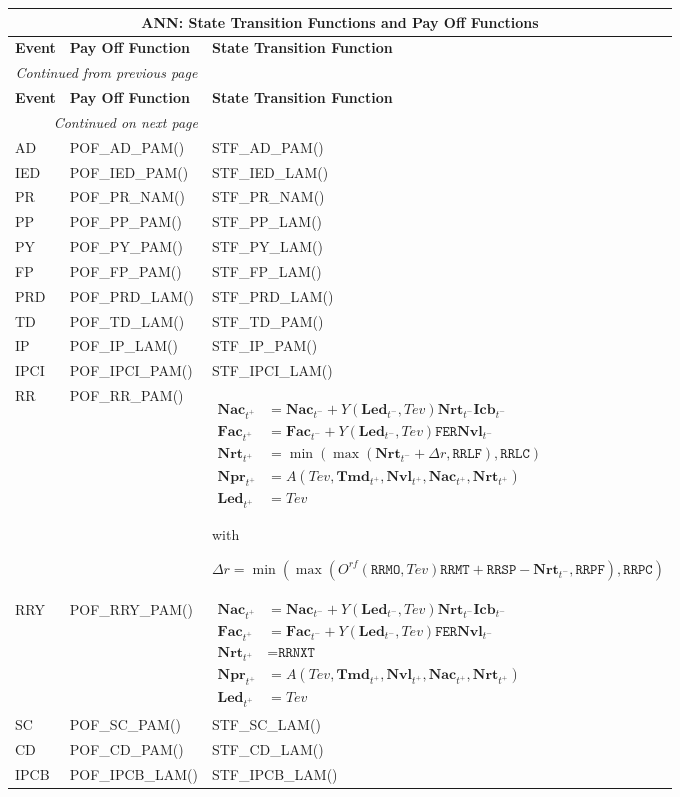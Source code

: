 \documentclass[9pt,oneside]{amsart}
\newenvironment{functions}[1]{
    	\begin{longtable}[H]{| p{0.05\textwidth} | p{0.42\textwidth} |  p{0.48\textwidth} |}
	\multicolumn{3}{c}{\textbf{#1: State Transition Functions and Pay Off Functions}}\\
	\hline
	\textbf{Event} & \textbf{Pay Off Function} & \textbf{State Transition Function}\\
	\hline
	\endfirsthead
	\multicolumn{2}{c}{\textit{Continued from previous page}} \\
	\hline
	\textbf{Event} & \textbf{Pay Off Function} & \textbf{State Transition Function}\\
	\hline
	\endhead
	\hline \multicolumn{2}{r}{\textit{Continued on next page}} \\
	\endfoot
	\hline
	\endlastfoot
}{%
	\hline
    	\end{longtable}
}
\newcommand{\svar}[2]{\textbf{#1}_{#2}}
\newcommand{\attr}[1]{\texttt{#1}}
\newcommand{\stf}[2]{STF\_#1\_#2()}
\newcommand{\pof}[2]{POF\_#1\_#2()}
\newcommand{\yfr}[2]{Y(#1,#2)}
\newcommand{\ann}[5]{A(#1,#2,#3,#4,#5)}
\newcommand{\obs}[3]{O^{#1}(#2,#3)}
\begin{document}





\begin{functions}{ANN}
	AD & \pof{AD}{PAM} & \stf{AD}{PAM} \\
	\hline
	IED & \pof{IED}{PAM} & \stf{IED}{LAM} \\ 
	\hline
	PR & \pof{PR}{NAM} & \stf{PR}{NAM} \\
	\hline
	PP & \pof{PP}{PAM}
		& \stf{PP}{LAM} \\
	\hline
	PY & \pof{PY}{PAM}
		& \stf{PY}{LAM} \\
	\hline
	FP & \pof{FP}{PAM}
		& \stf{FP}{LAM} \\
	\hline 
  	PRD & \pof{PRD}{LAM}
		& \stf{PRD}{LAM} \\
	\hline
  	TD & \pof{TD}{LAM}
		& \stf{TD}{PAM} \\
	\hline
	IP & \pof{IP}{LAM}
		& \stf{IP}{PAM} \\
	\hline
	IPCI & \pof{IPCI}{PAM}
		& \stf{IPCI}{LAM} \\
	\hline
	RR & \pof{RR}{PAM}
		& {$\begin{aligned} 
			\svar{Nac}{t^+} &= \svar{Nac}{t^-} + \yfr{\svar{Led}{t^-}}{Tev}\svar{Nrt}{t^-}\svar{Icb}{t^-} \\
			\svar{Fac}{t^+} &= \svar{Fac}{t^-} + \yfr{\svar{Led}{t^-}}{Tev}\attr{FER}\svar{Nvl}{t^-} \\
			\svar{Nrt}{t^+} &= \min(\max(\svar{Nrt}{t^-}+\Delta r,\attr{RRLF}),\attr{RRLC}) \\
			\svar{Npr}{t^+} &= \ann{Tev}{\svar{Tmd}{t^+}}{\svar{Nvl}{t^+}}{\svar{Nac}{t^+}}{\svar{Nrt}{t^+}} \\
			\svar{Led}{t^+} &= Tev \end{aligned}$}\par
		with\par
		$\Delta r = \min(\max(\obs{rf}{\attr{RRMO}}{Tev}\attr{RRMT}+\attr{RRSP} - \svar{Nrt}{t^-},\attr{RRPF}),\attr{RRPC})$ \\
	\hline
	RRY & \pof{RRY}{PAM} 
		& {$\begin{aligned} 
			\svar{Nac}{t^+} &= \svar{Nac}{t^-} + \yfr{\svar{Led}{t^-}}{Tev}\svar{Nrt}{t^-}\svar{Icb}{t^-} \\
			\svar{Fac}{t^+} &= \svar{Fac}{t^-} + \yfr{\svar{Led}{t^-}}{Tev}\attr{FER}\svar{Nvl}{t^-} \\
			\svar{Nrt}{t^+} &= \attr{RRNXT} \\
			\svar{Npr}{t^+} &= \ann{Tev}{\svar{Tmd}{t^+}}{\svar{Nvl}{t^+}}{\svar{Nac}{t^+}}{\svar{Nrt}{t^+}} \\
			\svar{Led}{t^+} &= Tev \end{aligned}$} \\
	\hline
	SC & \pof{SC}{PAM}
		& \stf{SC}{LAM} \\
	\hline 
	CD & \pof{CD}{PAM}
		& \stf{CD}{LAM} \\
	\hline
	IPCB & \pof{IPCB}{LAM}
		& \stf{IPCB}{LAM} \\
\end{functions}
\end{document}
